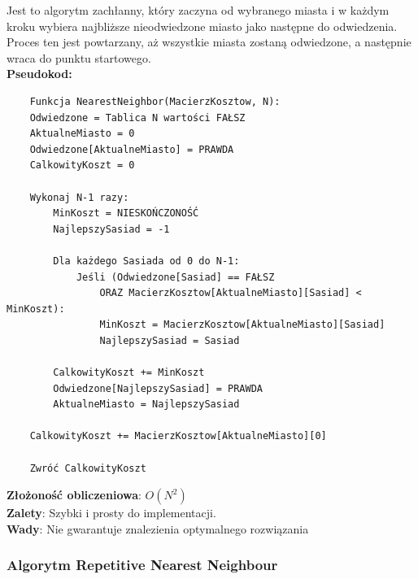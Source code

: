 \documentclass[a4paper,12pt]{article}
\begin{document}
Jest to algorytm zachłanny, który zaczyna od wybranego miasta i w każdym kroku wybiera najbliższe nieodwiedzone miasto jako następne do odwiedzenia.
Proces ten jest powtarzany, aż wszystkie miasta zostaną odwiedzone, a następnie wraca do punktu startowego. \\
\textbf{Pseudokod:} \\
\begin{verbatim}
    Funkcja NearestNeighbor(MacierzKosztow, N):
    Odwiedzone = Tablica N wartości FAŁSZ
    AktualneMiasto = 0
    Odwiedzone[AktualneMiasto] = PRAWDA
    CalkowityKoszt = 0
    
    Wykonaj N-1 razy:
        MinKoszt = NIESKOŃCZONOŚĆ
        NajlepszySasiad = -1
        
        Dla każdego Sasiada od 0 do N-1:
            Jeśli (Odwiedzone[Sasiad] == FAŁSZ 
                ORAZ MacierzKosztow[AktualneMiasto][Sasiad] < MinKoszt):
                MinKoszt = MacierzKosztow[AktualneMiasto][Sasiad]
                NajlepszySasiad = Sasiad
                
        CalkowityKoszt += MinKoszt
        Odwiedzone[NajlepszySasiad] = PRAWDA
        AktualneMiasto = NajlepszySasiad
        
    CalkowityKoszt += MacierzKosztow[AktualneMiasto][0] 
    
    Zwróć CalkowityKoszt
\end{verbatim}
\textbf{Złożoność obliczeniowa}: $O(N^2)$ \\
\textbf{Zalety}: Szybki i prosty do implementacji. \\
\textbf{Wady}: Nie gwarantuje znalezienia optymalnego rozwiązania

\subsubsection{Algorytm Repetitive Nearest Neighbour}
\end{document}
